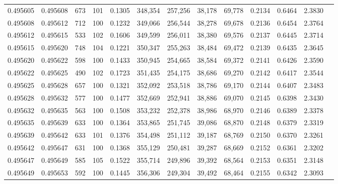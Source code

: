\begin{tabular}{rrrrrrrrrrrrr}
0.495605 & 0.495608 &   673 & 101 &                                     0.1305 & 348,354 & 257,256 &  38,178 &  69,778 & 0.2134 & 0.6464 & 2.3830 \\
0.495608 & 0.495612 &   712 & 100 &                                     0.1232 & 349,066 & 256,544 &  38,278 &  69,678 & 0.2136 & 0.6454 & 2.3764 \\
0.495612 & 0.495615 &   533 & 102 &                                     0.1606 & 349,599 & 256,011 &  38,380 &  69,576 & 0.2137 & 0.6445 & 2.3714 \\
0.495615 & 0.495620 &   748 & 104 &                                     0.1221 & 350,347 & 255,263 &  38,484 &  69,472 & 0.2139 & 0.6435 & 2.3645 \\
0.495620 & 0.495622 &   598 & 100 &                                     0.1433 & 350,945 & 254,665 &  38,584 &  69,372 & 0.2141 & 0.6426 & 2.3590 \\
0.495622 & 0.495625 &   490 & 102 &                                     0.1723 & 351,435 & 254,175 &  38,686 &  69,270 & 0.2142 & 0.6417 & 2.3544 \\
0.495625 & 0.495628 &   657 & 100 &                                     0.1321 & 352,092 & 253,518 &  38,786 &  69,170 & 0.2144 & 0.6407 & 2.3483 \\
0.495628 & 0.495632 &   577 & 100 &                                     0.1477 & 352,669 & 252,941 &  38,886 &  69,070 & 0.2145 & 0.6398 & 2.3430 \\
0.495632 & 0.495635 &   563 & 100 &                                     0.1508 & 353,232 & 252,378 &  38,986 &  68,970 & 0.2146 & 0.6389 & 2.3378 \\
0.495635 & 0.495639 &   633 & 100 &                                     0.1364 & 353,865 & 251,745 &  39,086 &  68,870 & 0.2148 & 0.6379 & 2.3319 \\
0.495639 & 0.495642 &   633 & 101 &                                     0.1376 & 354,498 & 251,112 &  39,187 &  68,769 & 0.2150 & 0.6370 & 2.3261 \\
0.495642 & 0.495647 &   631 & 100 &                                     0.1368 & 355,129 & 250,481 &  39,287 &  68,669 & 0.2152 & 0.6361 & 2.3202 \\
0.495647 & 0.495649 &   585 & 105 &                                     0.1522 & 355,714 & 249,896 &  39,392 &  68,564 & 0.2153 & 0.6351 & 2.3148 \\
0.495649 & 0.495653 &   592 & 100 &                                     0.1445 & 356,306 & 249,304 &  39,492 &  68,464 & 0.2155 & 0.6342 & 2.3093 \\

\end{tabular}

